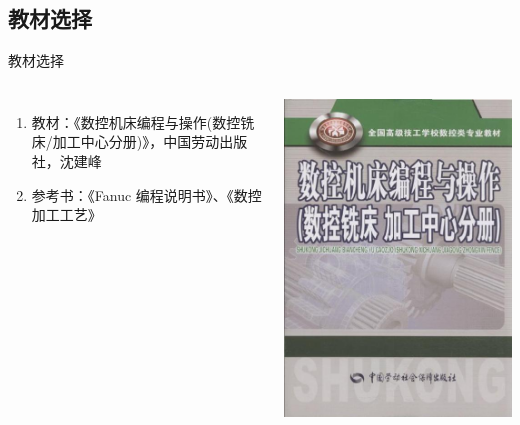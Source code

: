 \documentclass[UTF8,zihao=-4]{ctexbeamer}
\begin{document}
\subsection{教材选择}
\begin{frame}{教材选择}
	\begin{columns}[onlytextwidth]

\begin{enumerate}
   \item 教材：《数控机床编程与操作(数控铣床/加工中心分册)》，中国劳动出版社，沈建峰     
    \item 参考书：《Fanuc 编程说明书》、《数控加工工艺》
\end{enumerate}
   

    \includegraphics[width=0.9\linewidth,trim=0 0 0 0,clip,angle=0]{image/5.jpg}
	\end{columns}
\end{frame}
\end{document}
